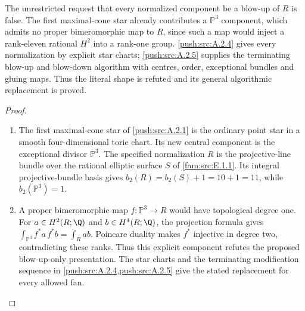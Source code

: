 The unrestricted request that every normalized component
be a blow-up of $R$ is false. The first maximal-cone
star already contributes a $\mathbb P^3$ component,
which admits no proper bimeromorphic map to $R$, since
such a map would inject a rank-eleven rational $H^2$
into a rank-one group. \ref{push:src:A.2.4} gives every normalization
by explicit star charts; \ref{push:src:A.2.5} supplies the terminating
blow-up and blow-down algorithm with centres, order,
exceptional bundles and gluing maps. Thus the literal
shape is refuted and its general algorithmic
replacement is proved.



\begin{proof}
\begin{enumerate}[label=\arabic*.,leftmargin=*]
\item The first maximal-cone star of \ref{push:src:A.2.1} is the
ordinary point star in a smooth four-dimensional toric chart.
Its new central component is the exceptional divisor
$\mathbb P^3$. The specified normalization $R$ is the
projective-line bundle over the rational elliptic surface $S$
of \ref{fam:src:E.1.1}. Its integral projective-bundle basis
gives $b_2(R)=b_2(S)+1=10+1=11$, while
$b_2(\mathbb P^3)=1$.

\item A proper bimeromorphic map $f:\mathbb P^3\to R$ would have
topological degree one. For $a\in H^2(R;\Q)$ and
$b\in H^4(R;\Q)$, the projection formula gives
$\int_{\mathbb P^3}f^*a\,f^*b=\int_Rab$.
Poincare duality makes $f^*$ injective in degree two, contradicting
these ranks. Thus this explicit component refutes the proposed
blow-up-only presentation. The star charts and the terminating
modification sequence in \ref{push:src:A.2.4,push:src:A.2.5}
give the stated replacement for every allowed fan.
\end{enumerate}
\end{proof}



